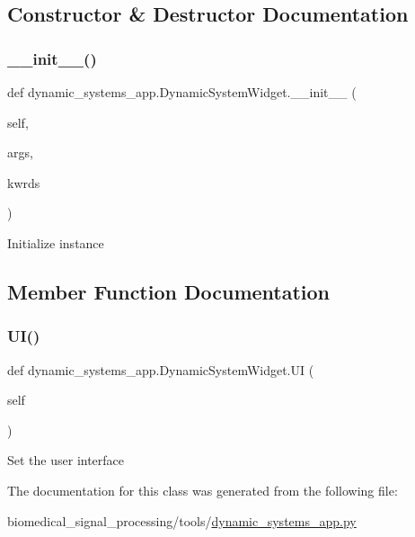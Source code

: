 \subsection{Constructor \& Destructor Documentation}
\mbox{\label{classdynamic__systems__app_1_1DynamicSystemWidget_a63e37c716046f650aeed787219bb708d}} 
\subsubsection{\texorpdfstring{\+\_\+\+\_\+init\+\_\+\+\_\+()}{\_\_init\_\_()}}
{\footnotesize\ttfamily def dynamic\+\_\+systems\+\_\+app.\+Dynamic\+System\+Widget.\+\_\+\+\_\+init\+\_\+\+\_\+ (\begin{DoxyParamCaption}\item[{}]{self,  }\item[{}]{args,  }\item[{}]{kwrds }\end{DoxyParamCaption})}

\begin{DoxyVerb}Initialize instance
\end{DoxyVerb}
 

\subsection{Member Function Documentation}
\mbox{\label{classdynamic__systems__app_1_1DynamicSystemWidget_a4a9ba786a3c93fac5257c0dc2c984e43}} 
\subsubsection{\texorpdfstring{U\+I()}{UI()}}
{\footnotesize\ttfamily def dynamic\+\_\+systems\+\_\+app.\+Dynamic\+System\+Widget.\+UI (\begin{DoxyParamCaption}\item[{}]{self }\end{DoxyParamCaption})}

\begin{DoxyVerb}Set the user interface
\end{DoxyVerb}
 

The documentation for this class was generated from the following file\+:\begin{DoxyCompactItemize}
\item 
biomedical\+\_\+signal\+\_\+processing/tools/\hyperlink{dynamic__systems__app_8py}{dynamic\+\_\+systems\+\_\+app.\+py}\end{DoxyCompactItemize}
